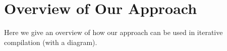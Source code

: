 \section{Overview of Our Approach}
Here we give an overview of how our approach can be used in iterative compilation (with a diagram). 